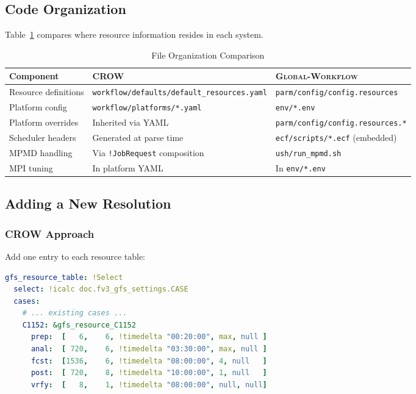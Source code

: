 \documentclass[11pt,twoside]{article}
\newcommand{\crow}{\textsc{CROW}}
\newcommand{\gw}{\textsc{Global-Workflow}}
\begin{document}
\subsection{Code Organization}

Table~\ref{tab:file_organization} compares where resource information resides in each system.

\begin{table}[H]
\centering
\caption{File Organization Comparison}
\label{tab:file_organization}
\begin{tabular}{@{}p{3.2cm}p{4.2cm}p{5.2cm}@{}}
\toprule
\textbf{Component} & \textbf{\crow{}} & \textbf{\gw{}} \\
\midrule
Resource definitions & \texttt{workflow/defaults/}\newline\texttt{default\_resources.yaml} & \texttt{parm/config/config.resources} \\
\addlinespace
Platform config & \texttt{workflow/platforms/}\newline\texttt{*.yaml} & \texttt{env/*.env} \\
\addlinespace
Platform overrides & Inherited via YAML & \texttt{parm/config/config.resources.*} \\
\addlinespace
Scheduler headers & Generated at parse time & \texttt{ecf/scripts/*.ecf} (embedded) \\
\addlinespace
MPMD handling & Via \texttt{!JobRequest} composition & \texttt{ush/run\_mpmd.sh} \\
\addlinespace
MPI tuning & In platform YAML & In \texttt{env/*.env} \\
\bottomrule
\end{tabular}
\end{table}

\subsection{Adding a New Resolution}

\subsubsection{CROW Approach}

Add one entry to each resource table:

\begin{lstlisting}[language=YAML, caption={Adding C1152 to \crow{}}]
gfs_resource_table: !Select
  select: !icalc doc.fv3_gfs_settings.CASE
  cases:
    # ... existing cases ...
    C1152: &gfs_resource_C1152
      prep:  [   6,    6, !timedelta "00:20:00", max, null ]
      anal:  [ 720,    6, !timedelta "03:30:00", max, null ]
      fcst:  [1536,    6, !timedelta "08:00:00", 4, null   ]
      post:  [ 720,    8, !timedelta "10:00:00", 1, null   ]
      vrfy:  [   8,    1, !timedelta "08:00:00", null, null]
\end{lstlisting}
\end{document}
